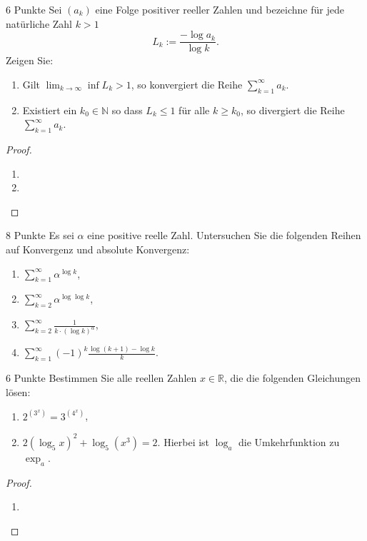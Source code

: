 \documentclass{../problemset}
\author{Michael van Straten}
\begin{document}
\maketitle


\begin{problem}{6 Punkte}
Sei $(a_k)$ eine Folge positiver reeller Zahlen und bezeichne für jede natürliche Zahl $k > 1$
\[ L_k := \frac{-\log a_k }{\log k}. \]
Zeigen Sie:
\begin{enumerate}
	\item Gilt $\lim_{k\to\infty} \inf L_k > 1$, so konvergiert die Reihe $\sum_{k=1}^{\infty} a_k$.
	\item Existiert ein $k_0 \in \mathbb{N}$ so dass $L_k \leq 1$ für alle $k \geq k_0$, so divergiert die Reihe $\sum_{k=1}^{\infty} a_k$.
\end{enumerate}
\begin{proof}
	$ $
	\begin{enumerate}
		\item
		\item
	\end{enumerate}
\end{proof}
\end{problem}

\begin{problem}{8 Punkte}
Es sei $\alpha$ eine positive reelle Zahl. Untersuchen Sie die folgenden Reihen auf Konvergenz
und absolute Konvergenz:
\begin{enumerate}
	\item $\sum_{k=1}^{\infty} \alpha^{\log k}$,
	\item $\sum_{k=2}^{\infty} \alpha^{\log \log k}$,
	\item $\sum_{k=2}^{\infty} \frac{1}{k \cdot (\log k)^\alpha}$,
	\item $\sum_{k=1}^{\infty} (-1)^k \frac{\log(k+1) - \log k}{k}$.
\end{enumerate}
\end{problem}

\begin{problem}{6 Punkte}
Bestimmen Sie alle reellen Zahlen $x \in \mathbb{R}$, die die folgenden Gleichungen lösen:
\begin{enumerate}
	\item $2^{(3^x)} = 3^{(4^x)}$,
	\item $2 (\log_5 x)^2 + \log_5 (x^3) = 2$. Hierbei ist $\log_a$ die Umkehrfunktion zu $\exp_a$.
\end{enumerate}
\begin{proof}
    \begin{enumerate}
        \item 
    \end{enumerate}
\end{proof}
\end{problem}
\end{document}
